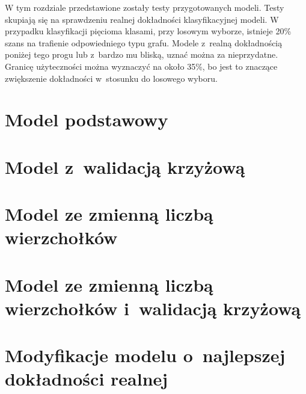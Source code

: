 W tym rozdziale przedstawione zostały testy przygotowanych modeli.
Testy skupiają się na sprawdzeniu realnej dokładności klasyfikacyjnej modeli.
W przypadku klasyfikacji pięcioma klasami, przy losowym wyborze, istnieje 20\% szans na trafienie odpowiedniego typu grafu.
Modele z~realną dokładnością poniżej tego progu lub z~bardzo mu bliską, uznać można za nieprzydatne.
Granicę użyteczności można wyznaczyć na około 35\%, bo jest to znaczące zwiększenie dokładności w~stosunku do losowego wyboru.

\section{Model podstawowy}


\section{Model z~walidacją krzyżową}


\section{Model ze zmienną liczbą wierzchołków}


\section{Model ze zmienną liczbą wierzchołków i~walidacją krzyżową}


\section{Modyfikacje modelu o~najlepszej dokładności realnej}

